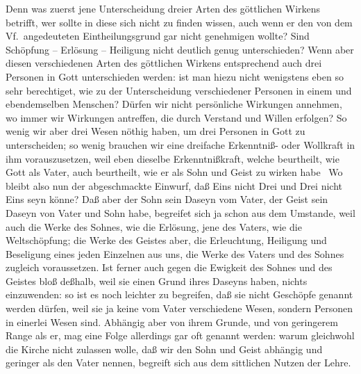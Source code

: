 Denn was zuerst jene Unterscheidung dreier Arten des göttlichen Wirkens betrifft, wer sollte in diese sich nicht zu finden wissen, auch wenn er den von dem Vf.\ angedeuteten Eintheilungsgrund gar nicht genehmigen wollte? Sind Schöpfung -- Erlösung -- Heiligung nicht deutlich genug unterschieden? Wenn aber diesen verschiedenen Arten des göttlichen Wirkens entsprechend auch drei Personen in Gott unterschieden werden: ist man hiezu nicht wenigstens eben so sehr berechtiget, wie zu der Unterscheidung verschiedener Personen in einem und ebendemselben Menschen? Dürfen wir nicht persönliche Wirkungen annehmen, wo immer wir Wirkungen antreffen, die durch Verstand und Willen erfolgen? So wenig wir aber drei Wesen nöthig haben, um drei Personen in Gott zu unterscheiden; so wenig brauchen wir eine dreifache Erkenntniß- oder Wollkraft in ihm vorauszusetzen, weil eben dieselbe Erkenntnißkraft, welche beurtheilt, wie Gott als Vater, auch beurtheilt, wie er als Sohn und Geist zu wirken habe \usw\ Wo bleibt also nun der abgeschmackte Einwurf, daß Eins nicht Drei und Drei nicht Eins seyn könne? Daß aber der Sohn sein Daseyn vom Vater, der Geist sein Daseyn von Vater und Sohn habe, begreifet sich ja schon aus dem Umstande, weil auch die Werke des Sohnes, wie die Erlösung, jene des Vaters, wie die Weltschöpfung; die Werke des Geistes aber, die Erleuchtung, Heiligung und Beseligung eines jeden Einzelnen aus uns, die Werke des Vaters und des Sohnes zugleich voraussetzen. Ist ferner auch gegen die Ewigkeit des Sohnes und des Geistes bloß deßhalb, weil sie einen Grund ihres Daseyns haben, nichts einzuwenden: so ist es noch leichter zu begreifen, daß sie nicht Geschöpfe genannt werden dürfen, weil sie ja keine vom Vater verschiedene Wesen, sondern Personen in einerlei Wesen sind. Abhängig aber von ihrem Grunde, und von geringerem Range als er, mag eine Folge allerdings gar oft genannt werden: warum gleichwohl die Kirche  nicht zulassen wolle, daß wir den Sohn und Geist abhängig und geringer als den Vater nennen, begreift sich aus dem sittlichen Nutzen der Lehre. \par
